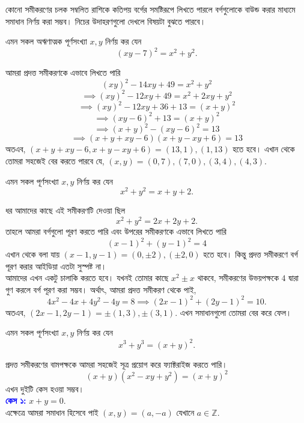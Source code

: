 \documentclass[11pt]{report}
\begin{document}
কোনো সমীকরণের চলক সম্বলিত রাশিকে কতিপয় বর্গের সমষ্টিরূপে লিখতে পারলে বর্গগুলোকে বাউন্ড করার মাধ্যমে সমাধান নির্ণয় করা সম্ভব। নিচের উদাহরণগুলো দেখলে বিষয়টা বুঝতে পারবে।\\

\begin{tcolorbox}[colframe=black!80!green,title=INMO]
এমন সকল অঋণাত্মক পূর্ণসংখ্যা $x, y$ নির্ণয় কর যেন $$(xy-7)^2=x^2+y^2.$$
\end{tcolorbox}

আমরা প্রদত্ত সমীকরণকে এভাবে লিখতে পারি $$(xy)^2-14xy+49=x^2+y^2$$ $$ \implies (xy)^2-12xy+49=x^2+2xy+y^2$$ $$\implies (xy)^2-12xy+36+13=(x+y)^2$$ $$\implies (xy-6)^2+13=(x+y)^2$$ $$\implies (x+y)^2-(xy-6)^2=13$$ $$\implies (x+y+xy-6)(x+y-xy+6)=13$$ অতএব, $(x+y+xy-6, x+y-xy+6) = (13,1), (1,13)$ হতে হবে। এখান থেকে তোমরা সহজেই বের করতে পারবে যে, $(x,y)=(0,7),(7,0),(3,4),(4,3).$\\

\begin{tcolorbox}[colframe=black!80!green,title=উদাহরণ 1.5.2]
এমন সকল পূর্ণসংখ্যা $x, y$ নির্ণয় কর যেন $$x^2+y^2=x+y+2.$$
\end{tcolorbox}

ধর আমাদের কাছে এই সমীকরণটি দেওয়া ছিল $$x^2+y^2=2x+2y+2.$$ তাহলে আমরা বর্গগুলো পূরণ করতে পারি এবং উপরের সমীকরণকে এভাবে লিখতে পারি $$(x-1)^2+(y-1)^2=4$$ এখান থেকে বলা যায় $(x-1, y-1)=(0,\pm 2), (\pm 2,0)$ হতে হবে। কিন্তু প্রদত্ত সমীকরণে বর্গ পূরণ করার আইডিয়া এতটা সুস্পষ্ট না।\\

আমাদের এখন একটু চালাকি করতে হবে। যখনই তোমার কাছে $x^2 \pm x$ থাকবে, সমীকরণের উভয়পক্ষকে $4$ দ্বারা গুণ করলে বর্গ পূরণ করা সম্ভব। অর্থাৎ, আমরা প্রদত্ত সমীকরণ থেকে পাই, $$4x^2 - 4x + 4y^2 - 4y = 8 \implies (2x-1)^2 + (2y-1)^2 = 10.$$ অতএব, $(2x-1,2y-1)= \pm (1,3), \pm (3,1).$ এখন সমাধানগুলো তোমরা বের করে ফেল।\\

\begin{tcolorbox}[colframe=black!80!green,title=উদাহরণ 1.5.3]
এমন সকল পূর্ণসংখ্যা $x, y$ নির্ণয় কর যেন $$x^3+y^3=(x+y)^2.$$
\end{tcolorbox}

প্রদত্ত সমীকরণের বামপক্ষকে আমরা সহজেই সূত্র প্রয়োগ করে ফ্যাক্টরাইজ করতে পারি। $$(x+y)(x^2-xy+y^2)=(x+y)^2$$ এখন দুইটি কেস হওয়া সম্ভব।\\

\textbf{\textcolor{blue}{কেস ১:}} $x+y=0.$\\

এক্ষেত্রে আমরা সমাধান হিসেবে পাই $(x,y) = (a, -a)$ যেখানে $a \in \mathbb{Z}.$\\
\end{document}

